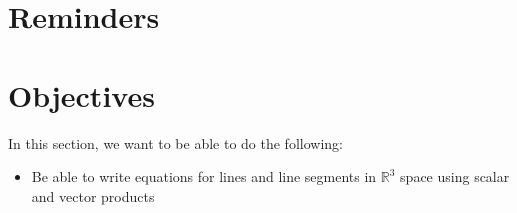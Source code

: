 \documentclass{report}
\newcommand{\R}{\mathbb{R}}
\begin{document}
\begin{sloppypar}
\section{Reminders}
\begin{itemize}
\end{itemize}

\section{Objectives}
In this section, we want to be able to do the
following:
\begin{itemize}
  \item Be able to write equations for lines
        and line segments in $ \R^{3} $ space
        using scalar and vector products
\end{itemize}


\end{sloppypar}
\end{document}
